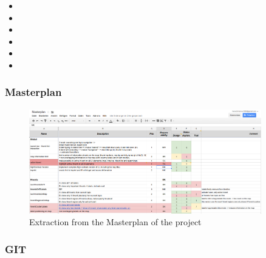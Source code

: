 \begin{itemize}
  \item
  \item
  \item
  \item
  \item
  \item
\end{itemize}


\subsubsection{Masterplan} %
\label{ssub:masterplan}

\begin{figure}[H]
  \begin{center}
    \includegraphics[width=0.9\textwidth]{graphics/Masterplan.png}
  \end{center}
  \caption{Extraction from the Masterplan of the project}
  \label{fig:masterplan}
\end{figure}


\subsubsection{GIT } %
\label{ssub:git_}

